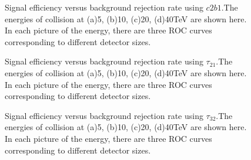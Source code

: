 \begin{figure}
\begin{center}
\end{center}
\caption{Signal efficiency versus background rejection rate using $c2b1$.The energies of collision at (a)5, (b)10, (c)20, (d)40TeV are shown here. In each picture of the energy, there are three ROC curves corresponding to different detector sizes.}
\label{fig:cluster_c2b1}
\end{figure}


\begin{figure}
\begin{center}
\end{center}
\caption{Signal efficiency versus background rejection rate using $\tau_{21}$.The energies of collision at (a)5, (b)10, (c)20, (d)40TeV are shown here. In each picture of the energy, there are three ROC curves corresponding to different detector sizes.}
\label{fig:cluster_tau21}
\end{figure}


\begin{figure}
\begin{center}
\end{center}
\caption{Signal efficiency versus background rejection rate using $\tau_{32}$.The energies of collision at (a)5, (b)10, (c)20, (d)40TeV are shown here. In each picture of the energy, there are three ROC curves corresponding to different detector sizes.}
\label{fig:cluster_tau32}
\end{figure}

